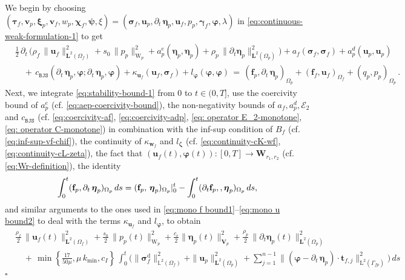 \documentclass[11pt]{article}
\numberwithin{equation}{section}
\newcommand{\ds}{\displaystyle}
\newcommand{\bgamma}{{\boldsymbol\gamma}}
\newcommand{\bbeta}{{\boldsymbol\eta}}
\newcommand{\bsi}{{\boldsymbol\sigma}}
\newcommand{\bvarphi}{{\boldsymbol\varphi}}
\newcommand{\bpsi}{{\boldsymbol\psi}}
\newcommand{\btau}{{\boldsymbol\tau}}
\newcommand{\bzeta}{{\boldsymbol\zeta}}
\newcommand{\bchi}{{\boldsymbol\chi}}
\newcommand{\bxi}{{\boldsymbol\xi}}
\newcommand{\bv}{{\mathbf{v}}}
\newcommand{\bw}{{\mathbf{w}}}
\newcommand{\f}{\mathbf{f}}
\newcommand{\bu}{\mathbf{u}}
\newcommand{\bt}{{\mathbf{t}}}
\newcommand{\0}{{\mathbf{0}}}
\def\bV{\mathbf{V}}
\def\bW{\mathbf{W}}
\newcommand{\bL}{\mathbf{L}}
\newcommand\bbL{\mathbb{L}}
\newcommand{\cE}{\mathcal{E}}
\def\L{\mathrm{L}}
\def\W{\mathrm{W}}
\def\rd{\mathrm{d}}
\def\BJS{\mathtt{BJS}}
\newenvironment{proof}{\noindent{\it Proof.}}{\hfill$\square$}
\numberwithin{equation}{section}
\begin{document}
%
\begin{proof}
We begin by choosing $(\btau_f, \bv_p, \bxi_p, \bv_f, w_p, \bchi_f, \bpsi, \xi) = (\bsi_f, \bu_p, \partial_t\,\bbeta_p, \bu_f, p_p, \bgamma_f, \bvarphi, \lambda)$ in \eqref{eq:continuous-weak-formulation-1} to get
\begin{align}
&\frac{1}{2}\,\partial_t\,\Big( \rho_f\,\|\bu_f\|^2_{\bL^2(\Omega_f)} 
+ s_0\,\|p_p\|^2_{\W_p} 
+ a^e_p(\bbeta_p, \bbeta_p)  
+ \rho_p\,\|\partial_t\bbeta_p\|^2_{\bL^2(\Omega_p)}\Big) 
+ a_f(\bsi_f, \bsi_f) 
+ a^d_p(\bu_p,\bu_p) \nonumber \\
&\quad +\, c_{\BJS}(\partial_t\,\bbeta_p, \bvarphi;\partial_t\,\bbeta_p, \bvarphi) 
+ \kappa_{\bu_f}(\bu_f,\bsi_f) 
+ l_{\bvarphi}(\bvarphi,\bvarphi)
\,=\, (\f_p,\partial_t\,\bbeta_p)_{\Omega_p} 
+ (\f_f,\bu_f)_{\Omega_f} 
+ (q_p,p_p)_{\Omega_p} \,.\label{eq:stability-bound-1}
\end{align}
Next, we integrate \eqref{eq:stability-bound-1} from $0$ to $t\in (0,T]$, use the coercivity bound of $a^e_p$ (cf. \eqref{eq:aep-coercivity-bound}), the non-negativity bounds of $a_f, a^d_p, \cE_2$ and $c_\BJS$ (cf. \eqref{eq:coercivity-af}, \eqref{eq:coercivity-adp}, \eqref{eq: operator E_2-monotone}, \eqref{eq: operator C-monotone}) in combination with the inf-sup condition of $B_f$ (cf. \eqref{eq:inf-sup-vf-chif}), the continuity of $\kappa_{\bw_f}$ and $l_{\bzeta}$ (cf. \eqref{eq:continuity-cK-wf}, \eqref{eq:continuity-cL-zeta}), the fact that $(\bu_f(t),\bvarphi(t)):[0,T]\to \bW_{r_1,r_2}$ (cf. \eqref{eq:Wr-definition}), the identity
\begin{equation*}
\int_0^t (\f_p,\partial_t\,\bbeta_p)_{\Omega_p}\, ds = (\f_p,\,\bbeta_p)_{\Omega_p}|_0^t - \int_0^t (\partial_t \f_p,\\,\bbeta_p)_{\Omega_p}\, ds,
\end{equation*}
and similar arguments to the ones used in \eqref{eq:mono f bound1}--\eqref{eq:mono u bound2} to deal with the terms $\kappa_{\bu_f}$ and $l_\bvarphi$, to obtain 
\begin{align}\label{eq:bound-unsteady-state-solution-1}
& \ds \frac{\rho_f}{2}\,\|\bu_f(t)\|^2_{\bL^2(\Omega_f)} + \frac{s_0}{2}\,\|p_p(t)\|^2_{\W_p} + \frac{c_e}{2}\|\bbeta_p(t)\|^2_{\bV_p} + \frac{\rho_p}{2}\,\| \partial_t\bbeta_p(t)\|^2_{\bL^2(\Omega_p)}\nonumber \\[1ex]
&\ds\quad +\, \min\left\{\frac{17}{50\mu},\mu\,k_{\min},c_I\right\}\, \int^t_0 \Big( \| \bsi^\rd_f\|^2_{\bbL^2(\Omega_f)} + \|\bu_p\|^2_{\bL^2(\Omega_p)} + \sum^{n-1}_{j=1} \|( \bvarphi - \partial_t\,\bbeta_p)\cdot\bt_{f,j}\|^2_{\L^2(\Gamma_{fp})} \Big)\, ds \nonumber \\[1ex]

\end{align}
\end{proof}
\end{document}
